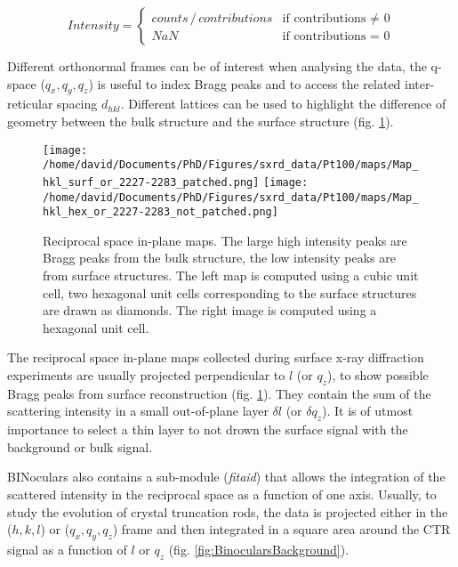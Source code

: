 \begin{equation}
    \label{eq:BinocularsIntensity}
    Intensity =
        \begin{cases}
            counts \, /  \,contributions  & \text{if contributions $\neq$ 0} \\
            NaN & \text{if contributions = 0}
        \end{cases}
\end{equation}

Different orthonormal frames can be of interest when analysing the data, the q-space ($q_x, q_y, q_z$) is useful to index Bragg peaks and to access the related inter-reticular spacing $d_{hkl}$.
Different lattices can be used to highlight the difference of geometry between the bulk structure and the surface structure (fig. \ref{fig:MapExampleBinoculars}).

\begin{figure}[!htb]
    \texttt{[image: /home/david/Documents/PhD/Figures/sxrd\_data/Pt100/maps/Map\_hkl\_surf\_or\_2227-2283\_patched.png]}
    \texttt{[image: /home/david/Documents/PhD/Figures/sxrd\_data/Pt100/maps/Map\_hkl\_hex\_or\_2227-2283\_not\_patched.png]}
    \caption{
    Reciprocal space in-plane maps.
    The large high intensity peaks are Bragg peaks from the bulk structure, the low intensity peaks are from surface structures.
    The left map is computed using a cubic unit cell, two hexagonal unit cells corresponding to the surface structures are drawn as diamonds.
    The right image is computed using a hexagonal unit cell.
    }
    \label{fig:MapExampleBinoculars}
\end{figure}

The reciprocal space in-plane maps collected during surface x-ray diffraction experiments are usually projected perpendicular to $l$ (or $q_z$), to show possible Bragg peaks from surface reconstruction (fig. \ref{fig:MapExampleBinoculars}).
They contain the sum of the scattering intensity in a small out-of-plane layer $\delta l$ (or $\delta q_z$).
It is of utmost importance to select a thin layer to not drown the surface signal with the background or bulk signal.

BINoculars also contains a sub-module (\textit{fitaid}) that allows the integration of the scattered intensity in the reciprocal space as a function of one axis.
Usually, to study the evolution of crystal truncation rods, the data is projected either in the ($h, k, l$) or ($q_x, q_y, q_z$) frame and then integrated in a square area around the CTR signal as a function of $l$ or $q_z$ (fig. \ref{fig:BinocularsBackground}).

